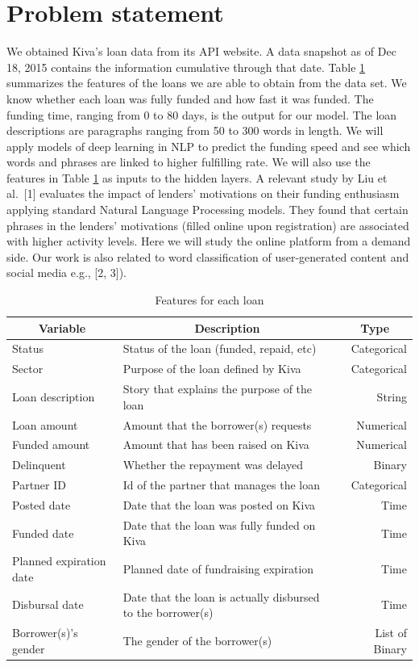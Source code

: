 \documentclass{article} %
\begin{document}
\section{Problem statement}
We obtained Kiva's loan data from its API website. A data snapshot as of Dec 18, 2015 contains the information cumulative through that date. Table \ref{features} summarizes the features of the loans we are able to obtain from the data set. We know whether each loan was fully funded and how fast it was funded. The funding time, ranging from 0 to 80 days, is the output for our model. The loan descriptions are paragraphs ranging from 50 to 300 words in length. We will apply models of deep learning in NLP to predict the funding speed and see which words and phrases are linked to higher fulfilling rate.  We will also use the features in Table \ref{features} as inputs to the hidden layers. A relevant study by Liu et al.\ [1] evaluates the impact of lenders' motivations on their funding enthusiasm applying standard Natural Language Processing models. They found that certain phrases in the lenders' motivations (filled online upon registration) are associated with higher activity levels. Here we will study the online platform from a demand side.  Our work is also related to word classification of user-generated content and social media e.g., [2, 3]). 

\begin{table}[ht]
\centering
\caption{Features for each loan}
\label{features}
\begin{tabular}{llr}
\multicolumn{1}{c}{\bf Variable}  &\multicolumn{1}{c}{\bf Description}   &\multicolumn{1}{c}{\bf Type}\\ \hline
Status  &  Status of the loan (funded, repaid, etc) & Categorical       \\
Sector  & Purpose of the loan defined by Kiva     &  Categorical\\
Loan description & Story that explains the purpose of the loan & String \\
Loan amount & Amount that the borrower(s) requests  & Numerical      \\
Funded amount & Amount that has been raised on Kiva   & Numerical     \\
Delinquent & Whether the repayment was delayed & Binary 
\\
Partner ID & Id of the partner that manages the loan & Categorical
\\
Posted date & Date that the loan was posted on Kiva  & Time     \\
Funded date  & Date that the loan was fully funded on Kiva  & Time     \\
Planned expiration date & Planned date of fundraising expiration  & Time     \\
Disbursal date & Date that the loan is actually disbursed to the borrower(s) & Time \\
Borrower(s)'s gender & The gender of the borrower(s) & List of Binary \\ \bottomrule
\end{tabular}    
\end{table}
\FloatBarrier
\end{document}
